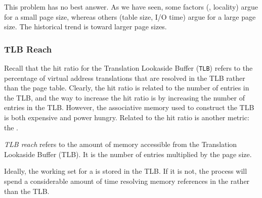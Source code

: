 This problem has no best answer.
As we have seen, some factors (, locality) argue for a small page size, whereas others (table size, I/O time) argue for a large page size.
The historical trend is toward larger page sizes.

\subsubsection{TLB Reach}\label{subsubsec:TLB_Reach}
Recall that the hit ratio for the Translation Lookaside Buffer (\texttt{TLB}) refers to the percentage of virtual address translations that are resolved in the TLB rather than the page table.
Clearly, the hit ratio is related to the number of entries in the TLB, and the way to increase the hit ratio is by increasing the number of entries in the TLB.\@
However, the associative memory used to construct the TLB is both expensive and power hungry.
Related to the hit ratio is another metric: the .

\begin{definition}\label{def:TLB_Reach}
  \emph{TLB reach} refers to the amount of memory accessible from the Translation Lookaside Buffer (TLB).
  It is the number of entries multiplied by the page size.
\end{definition}

Ideally, the working set for a  is stored in the TLB.\@
If it is not, the process will spend a considerable amount of time resolving memory references in the  rather than the TLB.\@

